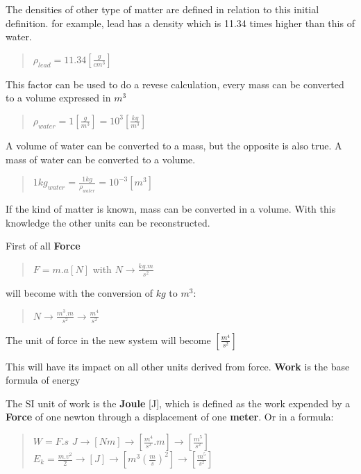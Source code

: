 \documentclass[]{article}
\begin{document}
The densities of other type of matter are defined in relation to this
initial definition. for example, lead has a density which is 11.34 times
higher than this of water.

\begin{quote}
\(\rho_{lead} = 11.34[\frac{g}{cm^3}]\)
\end{quote}

This factor can be used to do a revese calculation, every mass can be
converted to a volume expressed in \(m^3\)

\begin{quote}
\(\rho_{water}=1[\frac{g}{m^3}] = 10^3 [\frac{kg}{m^3}]\)
\end{quote}

A volume of water can be converted to a mass, but the opposite is also
true. A mass of water can be converted to a volume.

\begin{quote}
\(1 kg_{water}= \frac{1 kg}{\rho_{water}}= 10^{-3} [m^3]\)
\end{quote}

If the kind of matter is known, mass can be converted in a volume. With
this knowledge the other units can be reconstructed.

First of all \textbf{Force}

\begin{quote}
\(F=m.a [N]\) with \(N  \rightarrow \frac{kg.m}{s^2}\)
\end{quote}

will become with the conversion of \(kg\) to \(m^3\):

\begin{quote}
\(N \rightarrow \frac{m^3.m}{s^2} \rightarrow \frac{m^4}{s^2}\)
\end{quote}

The unit of force in the new system will become \([\frac{m^4}{s^2}]\)

This will have its impact on all other units derived from force.
\textbf{Work} is the base formula of energy

The SI unit of work is the \textbf{Joule} {[}J{]}, which is defined as
the work expended by a \textbf{Force} of one newton through a
displacement of one \textbf{meter}. Or in a formula:

\begin{quote}
\(W=F.s\)
\(J \rightarrow [Nm] \rightarrow [\frac{m^4}{s^2}.m] \rightarrow [\frac{m^5}{s^2}]\)
\(E_k=\frac{m.v^2}{2} \rightarrow [J] \rightarrow [m^3 (\frac{m}{s})^2] \rightarrow [\frac{m^5}{s^2}]\)
\end{quote}
\end{document}

